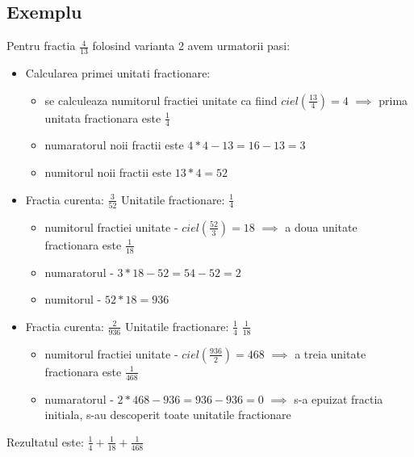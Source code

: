 \documentclass[runningheads]{llncs}
\begin{document}
\subsection{Exemplu}
Pentru fractia $\frac{4}{13}$ folosind varianta 2 avem urmatorii pasi:
\vspace*{1em}
\begin{itemize}
	\setlength\itemsep{1em}
	\item Calcularea primei unitati fractionare:
	\vspace*{0.2em}
	\begin{itemize}
		\setlength\itemsep{0.6em}
		\item se calculeaza numitorul fractiei unitate ca fiind $ciel(\frac{13}{4}) = 4$ $\implies$ prima unitata fractionara este $\frac{1}{4}$
		\item numaratorul noii fractii este $4 * 4 - 13 = 16 - 13 = 3$
		\item numitorul noii fractii este $13 * 4 = 52$
	\end{itemize}
	\vspace*{1em}
	\item Fractia curenta: $\frac{3}{52}$ Unitatile fractionare: $\frac{1}{4}$
	\vspace*{0.2em}
	\begin{itemize}
		\setlength\itemsep{0.6em}
		\item numitorul fractiei unitate - $ciel(\frac{52}{3}) = 18$ $\implies$ a doua unitate fractionara este $\frac{1}{18}$
		\item numaratorul - $3 * 18 - 52 = 54 - 52 = 2$
		\item numitorul - $52 * 18 = 936$
	\end{itemize}
	
	\item Fractia curenta: $\frac{2}{936}$ Unitatile fractionare: $\frac{1}{4}$ $\frac{1}{18}$
	\vspace*{0.2em}
	\begin{itemize}
		\setlength\itemsep{0.6em}
		\item numitorul fractiei unitate - $ciel(\frac{936}{2}) = 468$ $\implies$ a treia unitate fractionara este $\frac{1}{468}$
		\item numaratorul - $2 * 468 - 936 = 936 - 936 = 0$ $\implies$ s-a epuizat fractia initiala, s-au descoperit toate unitatile fractionare
	\end{itemize}
\end{itemize}

Rezultatul este: $\frac{1}{4} + \frac{1}{18} + \frac{1}{468}$
\end{document}
